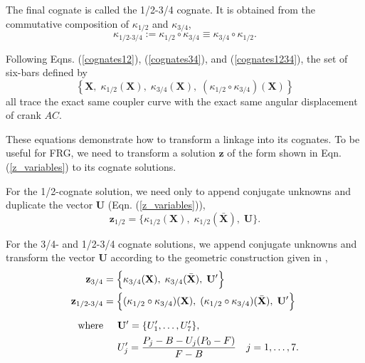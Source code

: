 \documentclass[journal]{IEEEtran}
\def\*#1{\bar{#1}} %
\begin{document}
The final cognate is called the 1/2-3/4 cognate.  It is obtained from the commutative composition of $\kappa_{1/2}$ and $\kappa_{3/4}$,
\begin{equation}
\kappa_{1/2\text{-}3/4} := \kappa_{1/2} \circ \kappa_{3/4} \equiv \kappa_{3/4} \circ \kappa_{1/2}. \label{cognates1234}
\end{equation}


Following Eqns. (\ref{cognates12}), (\ref{cognates34}), and (\ref{cognates1234}), the set of six-bars defined by 
\begin{equation}
\left\lbrace
\mathbf{X}, \;
\kappa_{1/2}(\mathbf{X}), \;
\kappa_{3/4}(\mathbf{X}), \;
(\kappa_{1/2}\circ\kappa_{3/4})(\mathbf{X})
\right\rbrace
\end{equation}
all trace the exact same coupler curve with the exact same angular displacement of crank $AC$.

These equations demonstrate how to transform a linkage into its cognates.
To be useful for FRG, we need to transform a solution $\mathbf{z}$ of the form shown in Eqn. (\ref{z_variables}) to its cognate solutions.

For the 1/2-cognate solution, we need only to append conjugate unknowns and duplicate the vector $\mathbf{U}$ (Eqn. (\ref{z_variables})),
\begin{equation}
\mathbf{z}_{1/2} = \Big\{
\kappa_{1/2}(\mathbf{X}), \;
\kappa_{1/2}(\*{\mathbf{X}}), \;
\mathbf{U} \Big\}.
\label{soln_cogns_12}
\end{equation}

For the 3/4- and 1/2-3/4 cognate solutions, we append conjugate unknowns and transform the vector $\mathbf{U}$ according to the geometric construction given in \cite{dijksmanSixBarCognatesStephenson1971},
\begin{align}
\mathbf{z}_{3/4} &= \Big\{
\kappa_{3/4}(\mathbf{X}), \;
\kappa_{3/4}(\*{\mathbf{X}}), \;
\mathbf{U}' \Big\} \label{soln_cogns_34_1234}\\
%
\mathbf{z}_{1/2\text{-}3/4} &= \Big\{
(\kappa_{1/2}\circ\kappa_{3/4})(\mathbf{X}), \;
(\kappa_{1/2}\circ\kappa_{3/4})(\*{\mathbf{X}}), \;
\mathbf{U}' \Big\} \nonumber\\[2mm]
%
\text{where} 
&\hspace{5mm} \mathbf{U}' = \{ U'_1, \ldots, U'_7 \}, \nonumber\\
&\hspace{5mm}  U'_j = \dfrac{P_j-B-U_j(P_0-F)}{F-B} \quad j=1,\ldots,7. \nonumber
\end{align}
\end{document}
